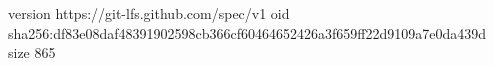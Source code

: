 version https://git-lfs.github.com/spec/v1
oid sha256:df83e08daf48391902598cb366cf60464652426a3f659ff22d9109a7e0da439d
size 865

